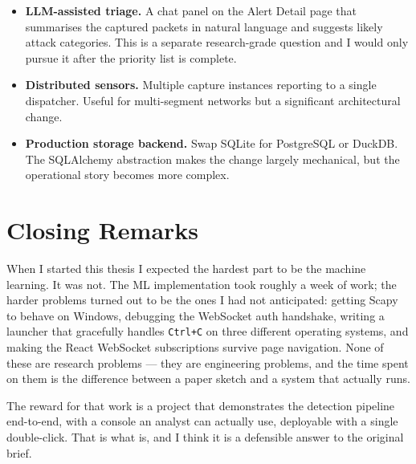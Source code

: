 \begin{itemize}
  \item \textbf{LLM-assisted triage.} A chat panel on the
    Alert Detail page that summarises the captured packets in
    natural language and suggests likely attack categories.
    This is a separate research-grade question and I would only
    pursue it after the priority list is complete.
  \item \textbf{Distributed sensors.} Multiple capture
    instances reporting to a single dispatcher. Useful for
    multi-segment networks but a significant architectural
    change.
  \item \textbf{Production storage backend.} Swap SQLite for
    PostgreSQL or DuckDB. The SQLAlchemy abstraction makes
    the change largely mechanical, but the operational story
    becomes more complex.
\end{itemize}

\section{Closing Remarks}
\label{sec:conc-closing}

When I started this thesis I expected the hardest part to be
the machine learning. It was not. The ML implementation took
roughly a week of work; the harder problems turned out to be the
ones I had not anticipated: getting Scapy to behave on Windows,
debugging the WebSocket auth handshake, writing a launcher that
gracefully handles \verb|Ctrl+C| on three different operating
systems, and making the React WebSocket subscriptions survive
page navigation. None of these are research problems --- they
are engineering problems, and the time spent on them is the
difference between a paper sketch and a system that actually
runs.

The reward for that work is a project that demonstrates the
detection pipeline end-to-end, with a console an analyst can
actually use, deployable with a single double-click. That is
what \nidsname{} is, and I think it is a defensible answer to
the original brief.
